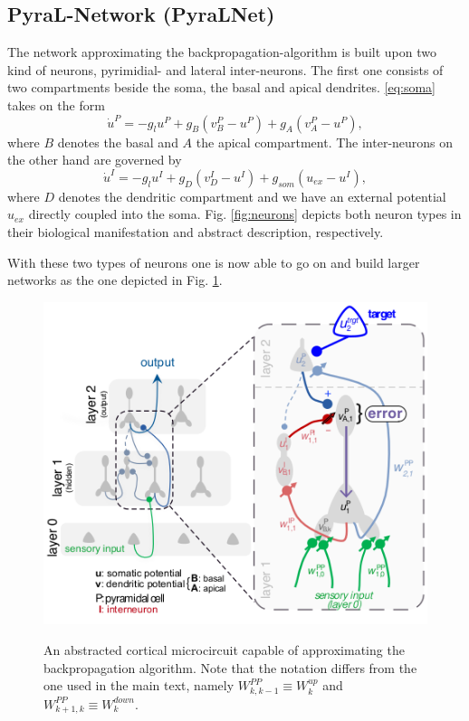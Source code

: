 \documentclass[12pt,a4paper]{article}
\begin{document}
\subsection{PyraL-Network (PyraLNet) }
The network approximating the backpropagation-algorithm is built upon two kind of neurons, pyrimidial- and lateral inter-neurons. The first one consists of two compartments beside the soma, the basal and apical dendrites. \eqref{eq:soma} takes on the form
\begin{equation}
\dot{u}^P = -g_lu^P + g_B(v^P_B - u^P) + g_A(v^P_A - u^P), 
\end{equation}
where $B$ denotes the basal and $A$ the apical compartment.
The inter-neurons on the other hand are governed by
\begin{equation}
\dot{u}^I = -g_lu^I + g_D(v^I_D - u^I) + g_{som}(u_{ex} - u^I),
\end{equation}
where $D$ denotes the dendritic compartment and we have an external potential $u_{ex}$ directly coupled into the soma. Fig. \ref{fig:neurons} depicts both neuron types in their biological manifestation and abstract description, respectively.

With these two types of neurons one is now able to go on and build larger networks as the one depicted in Fig. \ref{fig:network}.

\begin{figure}[!ht]
  \centering
  \includegraphics[height=0.55\linewidth]{img/network.png}
  \label{fig:network}
  \caption{An abstracted cortical microcircuit capable of approximating the backpropagation algorithm. Note that the notation differs from the one used in the main text, namely $W^{PP}_{k,k-1}\equiv W^{up}_k$ and $W^{PP}_{k+1,k}\equiv W^{down}_k$.}
\end{figure}
\end{document}
